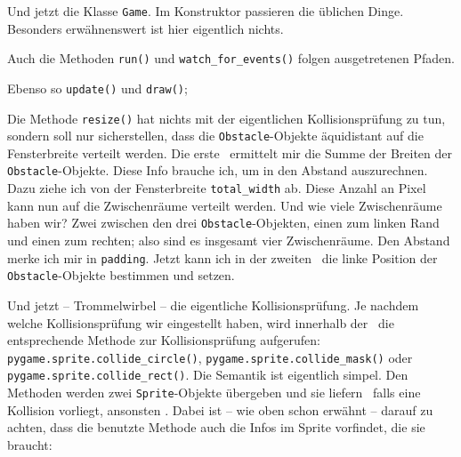 Und jetzt die Klasse \texttt{Game}. Im Konstruktor passieren die üblichen Dinge. Besonders erwähnenswert ist hier eigentlich nichts.


Auch die Methoden \texttt{run()} und \texttt{watch\_for\_events()} folgen ausgetretenen Pfaden.


Ebenso so \texttt{update()} und \texttt{draw()};


Die Methode \texttt{resize()} hat nichts mit der eigentlichen Kollisionsprüfung zu tun, sondern soll nur sicherstellen, dass die \texttt{Obstacle}-Objekte äquidistant auf die Fensterbreite verteilt werden. Die erste \forSchleife\ ermittelt mir die Summe der Breiten der \texttt{Obstacle}-Objekte. Diese Info brauche ich, um in  den Abstand auszurechnen. Dazu ziehe ich von der Fensterbreite \texttt{total\_width} ab. Diese Anzahl an Pixel kann nun auf die Zwischenräume verteilt werden. Und wie viele Zwischenräume haben wir? Zwei zwischen den drei \texttt{Obstacle}-Objekten, einen zum linken Rand und einen zum rechten; also sind es insgesamt vier Zwischenräume. Den Abstand merke ich mir in \texttt{padding}. Jetzt kann ich in der zweiten \forSchleife\ die linke Position der \texttt{Obstacle}-Objekte bestimmen und setzen.


Und jetzt -- Trommelwirbel -- die eigentliche Kollisionsprüfung. Je nachdem welche Kollisionsprüfung wir eingestellt haben, wird innerhalb der \forSchleife\ die entsprechende Methode zur Kollisionsprüfung aufgerufen: \texttt{pygame.sprite.collide\_circle()}, \texttt{pygame.\-sprite.\-collide\_mask()} oder \texttt{pygame.sprite.collide\_rect()}. Die Semantik ist eigentlich simpel. Den Methoden werden zwei \texttt{Sprite}-Objekte übergeben und sie liefern \true\ falls eine Kollision vorliegt, ansonsten \false. Dabei ist -- wie oben schon erwähnt -- darauf zu achten, dass die benutzte Methode auch die Infos im Sprite vorfindet, die sie braucht:

